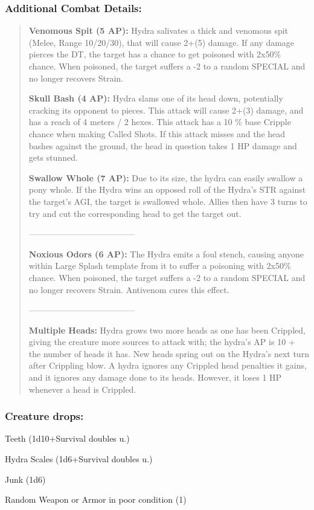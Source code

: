 \documentclass[11pt,a4paper,twocolumn]{book}
\begin{document}
	\subsubsection*{Additional Combat Details: }
	\begin{verse}
		
		\textbf{Venomous Spit (5 AP):} Hydra salivates a thick and venomous spit (Melee, Range 10/20/30), that will cause 2+(5) damage. If any damage pierces the DT, the target has a chance to get poisoned with 2x50\% chance. When poisoned, the target suffers  a -2 to a random SPECIAL and no longer recovers Strain. 
		
		\textbf{Skull Bash (4 AP):} Hydra slams one of its head down, potentially cracking its opponent to pieces. This attack will cause 2+(3) damage, and has a reach of 4 meters / 2 hexes. This attack has a 10 \% base Cripple chance when making Called Shots. If this attack misses and the head bashes against the ground, the head in question takes 1 HP damage and gets stunned.
		
		\textbf{Swallow Whole (7 AP):} Due to its size, the hydra can easily swallow a pony whole. If the Hydra wins an opposed roll of the Hydra's STR against the target's AGI, the target is swallowed whole. Allies then have 3 turns to try and cut the corresponding head to get the target out.
		
		--------------------------------------
		
		\textbf{Noxious Odors (6 AP):} The Hydra emits a foul stench, causing anyone within Large Splash template from it to suffer a poisoning with 2x50\% chance. When poisoned, the target suffers  a -2 to a random SPECIAL and no longer recovers Strain. Antivenom cures this effect.
		
		--------------------------------------				
		
		\textbf{\dag Multiple Heads:} Hydra grows two more heads as one has been Crippled, giving the creature more sources to attack with; the hydra's AP is 10 + the number of heads it has. New heads spring out on the Hydra's next turn after Crippling blow. A hydra ignores any Crippled head penalties it gains, and it ignores any damage done to its heads. However, it loses 1 HP whenever a head is Crippled.
		
	\end{verse}
	
	\subsubsection*{Creature drops:}
	\begin{compactitem}
		\item Teeth (1d10+Survival doubles u.)
		\item Hydra Scales (1d6+Survival doubles u.)
		\item Junk (1d6)
		\item Random Weapon or Armor in poor condition (1)
	\end{compactitem}
	
\end{document}

